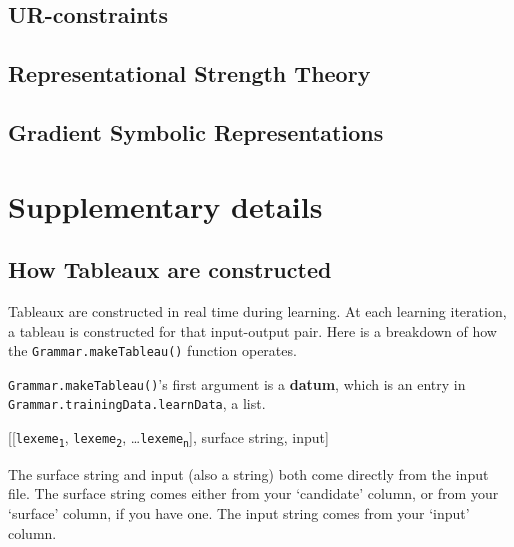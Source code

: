 \documentclass[12]{article}
\begin{document}

		
	\subsection{UR-constraints}

	\subsection{Representational Strength Theory}

	\subsection{Gradient Symbolic Representations}


\section{Supplementary details}
	\subsection{How Tableaux are constructed}
	Tableaux are constructed in real time during learning. At each learning iteration, a tableau is constructed for that input-output pair.  Here is a breakdown of how the \texttt{Grammar.makeTableau()} function operates.
	
	\texttt{Grammar.makeTableau()}'s first argument is a {\bf datum}, which is an entry in \texttt{Grammar.trainingData.learnData}, a list.
	
	\begin{exe}
		  [[\texttt{lexeme\textsubscript{1}}, \texttt{lexeme\textsubscript{2}}, \ldots \texttt{lexeme\textsubscript{n}}], surface string, input]
	\end{exe}

	The surface string and input (also a string) both come directly from the input file.  The surface string comes either from your `candidate' column, or from your `surface' column, if you have one.  The input string comes from your `input' column.
	
\end{document}
